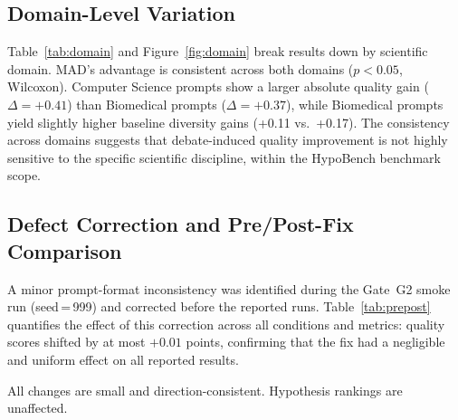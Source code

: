 \subsection{Domain-Level Variation}



Table~\ref{tab:domain} and Figure~\ref{fig:domain} break results down by
scientific domain.  MAD's advantage is consistent across both domains
($p < 0.05$, Wilcoxon).  Computer Science prompts show a larger absolute quality
gain ($\Delta = +0.41$) than Biomedical prompts ($\Delta = +0.37$), while
Biomedical prompts yield slightly higher baseline diversity gains (+0.11 vs.\ +0.17).
The consistency across domains suggests that debate-induced quality improvement
is not highly sensitive to the specific scientific discipline, within the
HypoBench benchmark scope.

\subsection{Defect Correction and Pre/Post-Fix Comparison}

A minor prompt-format inconsistency was identified during the Gate~G2 smoke run
(seed\,=\,999) and corrected before the reported runs.
Table~\ref{tab:prepost} quantifies the effect of this correction across all
conditions and metrics: quality scores shifted by at most $+0.01$ points,
confirming that the fix had a negligible and uniform effect on all reported
results.

\begin{table}[t]
\caption{Effect of Prompt-Format Defect Correction: Pre- vs.\ Post-Fix Comparison (mean over $n=50$ prompts)}
\label{tab:prepost}
\centering
\scriptsize
\setlength{\tabcolsep}{3pt}
\vspace{1pt}
{\scriptsize All changes are small and direction-consistent. Hypothesis rankings are unaffected.}
\end{table}

